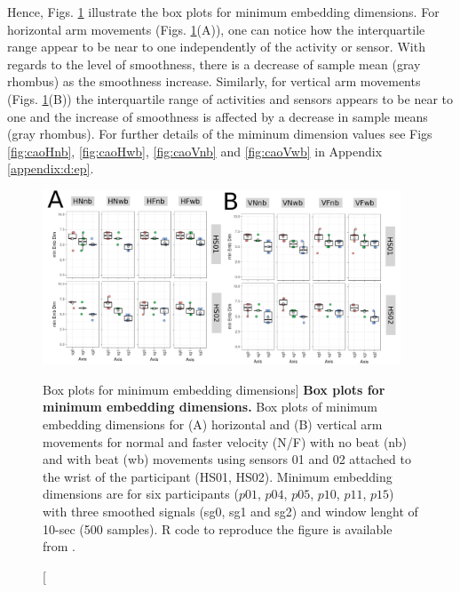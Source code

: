 Hence, Figs. \ref{fig:CAO-hii} illustrate the box plots for minimum 
embedding dimensions.
For horizontal arm movements (Figs. \ref{fig:CAO-hii}(A)), 
one can notice how the interquartile range  
appear to be near to one independently of the 
activity or sensor. 
With regards to the level of smoothness,
there is a decrease of sample mean (gray rhombus) 
as the smoothness increase.  
Similarly, for vertical arm movements (Figs. \ref{fig:CAO-hii}(B))
the interquartile range of activities and sensors 
appears to be near to one and the increase of smoothness 
is affected by a decrease in sample means (gray rhombus).
For further details of the miminum dimension values see 
Figs \ref{fig:caoHnb}, \ref{fig:caoHwb}, \ref{fig:caoVnb} and 
\ref{fig:caoVwb} in Appendix \ref{appendix:d:ep}.
\begin{figure}
\centering
\includegraphics[width=0.95\textwidth]{CAO}
	\caption
	[Box plots for minimum embedding dimensions]{
	{\bf Box plots for minimum embedding dimensions.} 
		Box plots of minimum embedding dimensions for 
		(A) horizontal and (B) vertical arm movements for
		normal  and faster velocity (N/F) with no beat (nb) 
		and with beat (wb) movements
		using sensors 01 and 02 attached to the wrist of the 
		participant (HS01, HS02).
		Minimum embedding dimensions are for six participants 
		($p01$, $p04$, $p05$, $p10$, $p11$, $p15$) with three 
		smoothed signals (sg0, sg1 and sg2)
		and window lenght of 10-sec (500 samples).
		R code to reproduce the figure is available 
		from \cite{hwum2018}.
        }
    \label{fig:CAO-hii}
\end{figure}

